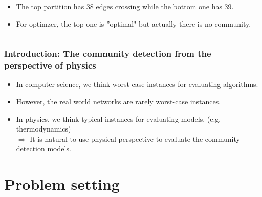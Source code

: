 \documentclass[dvipdfmx,11pt]{beamer}
\begin{document}
\begin{frame}
\begin{columns}
      \begin{column}{0.60\textwidth}
        \begin{itemize}
          \item The top partition has 38 edges crossing while the bottom one has 39.
          \item For optimzer, the top one is ''optimal" but actually there is no community. 
        \end{itemize}
      \end{column}
    \end{columns}
\end{frame}



\begin{frame}
  \frametitle{Introduction: The community detection from the perspective of physics}

  \begin{itemize}
      \item In computer science, we think \alert{worst-case instances} for evaluating algorithms.
      \item However, the real world networks are rarely worst-case instances.
      \item In physics, we think \alert{typical instances} for evaluating models. (e.g. thermodynamics) \\
      $\Rightarrow$ It is natural to use physical perspective to evaluate the community detection models.
  \end{itemize}
\end{frame}



\section{Problem setting}
\end{document}
